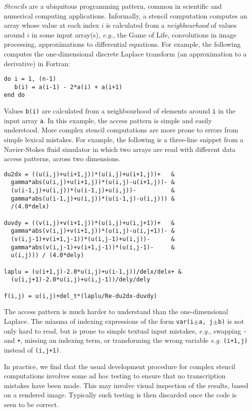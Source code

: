 \documentclass{article}
\newcommand{\eg}{\emph{e.g.}}
\begin{document}
\emph{Stencils} are a ubiquitous programming pattern, common in
scientific and numerical computing applications. Informally, a stencil
computation computes an array whose value at each index $i$ is
calculated from a \emph{neighbourhood} of values around $i$ in some
input array(s), \eg{}, the Game of Life, convolutions in image
processing, approximations to differential equations. For example, the
following computes the one-dimensional discrete Laplace transform (an
approximation to a derivative) in Fortran:
%
\begin{verbatim}
do i = 1, (n-1)
   b(i) = a(i-1) - 2*a(i) + a(i+1)
end do
\end{verbatim}
%
Values \texttt{b(i)} are calculated from a neighbourhood of elements
around \texttt{i} in the input array \texttt{a}.  In this example, the
access pattern is simple and easily understood. More complex
stencil computations are more prone to errors from simple lexical
mistakes. For example, the following is a three-line snippet from a
Navier-Stokes fluid simulator in which two arrays are read with
different data access patterns, across two dimensions.
\begin{verbatim}
du2dx = ((u(i,j)+u(i+1,j))*(u(i,j)+u(i+1,j))+   &
  gamma*abs(u(i,j)+u(i+1,j))*(u(i,j)-u(i+1,j))- &
  (u(i-1,j)+u(i,j))*(u(i-1,j)+u(i,j))-          &
  gamma*abs(u(i-1,j)+u(i,j))*(u(i-1,j)-u(i,j))) &
  /(4.0*delx)

duvdy = ((v(i,j)+v(i+1,j))*(u(i,j)+u(i,j+1))+   &
  gamma*abs(v(i,j)+v(i+1,j))*(u(i,j)-u(i,j+1))- &
  (v(i,j-1)+v(i+1,j-1))*(u(i,j-1)+u(i,j))-      &
  gamma*abs(v(i,j-1)+v(i+1,j-1))*(u(i,j-1)-     &
  u(i,j))) / (4.0*dely)

laplu = (u(i+1,j)-2.0*u(i,j)+u(i-1,j))/delx/delx+ &
  (u(i,j+1)-2.0*u(i,j)+u(i,j-1))/dely/dely

f(i,j) = u(i,j)+del_t*(laplu/Re-du2dx-duvdy)
\end{verbatim}
The access pattern is much harder to understand than the
one-dimensional Laplace.  The miasma of indexing expressions of the
form \texttt{var(i$\pm$a, j$\pm$b)} is not only hard to read, but is
prone to simple textual input mistakes, \eg{}, swapping \texttt{-} and
\texttt{+}, missing an indexing term, or transforming the wrong
variable \eg{} \texttt{(i+1,j)} instead of \texttt{(i,j+1)}.

In practice, we find that the usual development procedure for complex
stencil computations involves some ad hoc testing to ensure that no
transcription mistakes have been made. This may involve visual
inspection of the results, based on a rendered image. Typically such
testing is then discarded once the code is seen to be correct.
\end{document}
